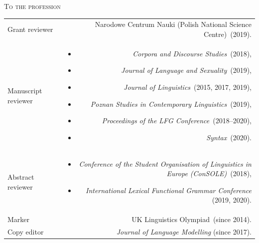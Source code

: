 \documentclass[11pt,a4paper]{article}
\makeatletter
\newlength{\rulelength}%
\newenvironment{cvsection}{%
  \setlength{\extrarowheight}{0.70ex}
  \begin{longtable}[l]{@{} L R @{}}
}{%
  \end{longtable}
}
\newlength{\squish}
\newenvironment{reviewlist}
{%
\vspace*{\squish}%
\begin{itemize}[noitemsep,label={},nosep,left=0pt .. \parindent]%
}
{%
\end{itemize}
}
\newcommand{\Label}[1]{%
\textnormal{#1}%
}
\newcommand{\cvheading}[1]{\noindent{{\color{oxfordblue}\rule[0.4ex]{\rulelength}{2pt}\hspace*{9pt} \Large #1}}\vspace*{0.5\baselineskip}}
\newcommand{\cvsubhead}[1]{\noindent\hspace*{\rulelength}\hspace*{9pt} \textsc{#1}\vspace*{0.25\baselineskip}}
\makeatother
\begin{document}
\cvheading{Service}

\cvsubhead{To the profession}
\begin{cvsection}
\Label{Grant reviewer} &
                    Narodowe Centrum Nauki (Polish National Science Centre)~(2019).\\
\Label{Manuscript reviewer} &
                \begin{reviewlist}
                \item \textit{Corpora and Discourse Studies}~(2018),
                \item \textit{Journal of Language and Sexuality}~(2019),
                \item \textit{Journal of Linguistics}~(2015, 2017, 2019),
                \item \textit{Poznan Studies in Contemporary Linguistics}~(2019),
                \item \textit{Proceedings of the LFG Conference}~(2018--2020),
                \item  \textit{Syntax}~(2020).
                \end{reviewlist}
                 \\[\squish]
\Label{Abstract reviewer}   &
                \begin{reviewlist}
                \item \textit{Conference of the Student Organisation of Linguistics in Europe (ConSOLE)}~(2018),
                \item \textit{International Lexical Functional Grammar Conference} (2019, 2020).
                \end{reviewlist}
                \\[\squish]
\Label{Marker}      & UK Linguistics Olympiad~(since 2014).\\
\Label{Copy editor} & \textit{Journal of Language Modelling} (since 2017).
\end{cvsection}
\end{document}
